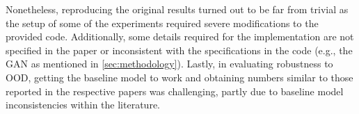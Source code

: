 Nonetheless, reproducing the original results turned out to be far from trivial as the setup of some of the experiments required severe modifications to the provided code. Additionally, some details required for the implementation are not specified in the paper or inconsistent with the specifications in the code (e.g., the GAN as mentioned in \cref{sec:methodology}). 
Lastly, in evaluating robustness to OOD, getting the baseline model to work and obtaining numbers similar to those reported in the respective papers was challenging, partly due to baseline model inconsistencies within the literature.






% 


